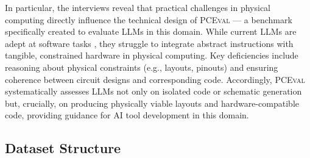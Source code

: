 \documentclass{article} %
\begin{document}
In particular, the interviews reveal that practical challenges in physical computing directly influence the technical design of \textsc{PCEval} — a benchmark specifically created to evaluate LLMs in this domain.
While current LLMs are adept at software tasks \citep{chen2021evaluating}, they struggle to integrate abstract instructions with tangible, constrained hardware in physical computing. Key deficiencies include reasoning about physical constraints (e.g., layouts, pinouts) and ensuring coherence between circuit designs and corresponding code. Accordingly, \textsc{PCEval} systematically assesses LLMs not only on isolated code or schematic generation but, crucially, on producing physically viable layouts and hardware-compatible code, providing guidance for AI tool development in this domain.

\subsection{Dataset Structure}
\end{document}
